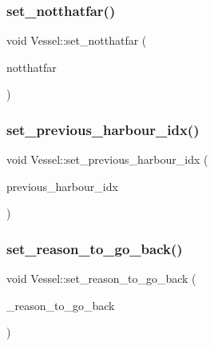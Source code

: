 \mbox{\label{class_vessel_a369c1bfd84a7421ded7f67aeab3143ce}} 
\subsubsection{\texorpdfstring{set\_notthatfar()}{set\_notthatfar()}}
{\footnotesize\ttfamily void Vessel\+::set\+\_\+notthatfar (\begin{DoxyParamCaption}\item[{\mbox{\hyperlink{classtypes_1_1_node_id}{types\+::\+Node\+Id}}}]{notthatfar }\end{DoxyParamCaption})}

\mbox{\label{class_vessel_a2cec7d694f826d29ef288a9fb3fea77a}} 
\subsubsection{\texorpdfstring{set\_previous\_harbour\_idx()}{set\_previous\_harbour\_idx()}}
{\footnotesize\ttfamily void Vessel\+::set\+\_\+previous\+\_\+harbour\+\_\+idx (\begin{DoxyParamCaption}\item[{\mbox{\hyperlink{classtypes_1_1_node_id}{types\+::\+Node\+Id}}}]{previous\+\_\+harbour\+\_\+idx }\end{DoxyParamCaption})}

\mbox{\label{class_vessel_a5fc044160f6defc28286aeab20579c61}} 
\subsubsection{\texorpdfstring{set\_reason\_to\_go\_back()}{set\_reason\_to\_go\_back()}}
{\footnotesize\ttfamily void Vessel\+::set\+\_\+reason\+\_\+to\+\_\+go\+\_\+back (\begin{DoxyParamCaption}\item[{int}]{\+\_\+reason\+\_\+to\+\_\+go\+\_\+back }\end{DoxyParamCaption})}

